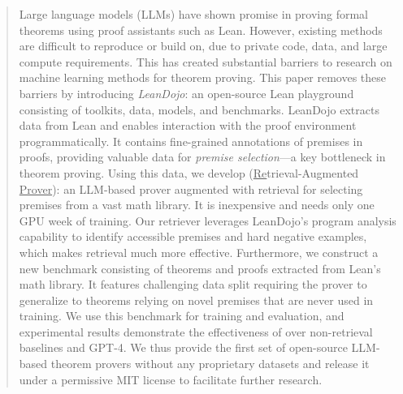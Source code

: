 \begin{abstract}
Large language models (LLMs) have shown promise in proving formal theorems using proof assistants such as Lean. However, existing methods are difficult to reproduce or build on, due to private code, data, and large compute requirements. This has created substantial barriers to research on machine learning methods for theorem proving. This paper removes these barriers by introducing \emph{LeanDojo}: an open-source Lean playground consisting of toolkits, data, models, and benchmarks. LeanDojo extracts data from Lean and enables interaction with the proof environment programmatically. It contains fine-grained annotations of premises in proofs, providing valuable data for \emph{premise selection}---a key bottleneck in theorem proving. Using this data, we develop \emph{\name} (\underline{Re}trieval-Augmented \underline{Prover}): an LLM-based prover augmented with retrieval for selecting premises from a vast math library. It is inexpensive and needs only one GPU week of training. Our retriever leverages LeanDojo's program analysis capability to identify accessible premises and hard negative examples, which makes retrieval much more effective. Furthermore, we construct a new benchmark consisting of {\numproofs} theorems and proofs extracted from Lean's math library. It features challenging data split requiring the prover to generalize to theorems relying on novel premises that are never used in training. We use this benchmark for training and evaluation, and experimental results demonstrate the effectiveness of {\name} over non-retrieval baselines and GPT-4. We thus provide the first set of open-source LLM-based theorem provers without any proprietary datasets and release it under a permissive MIT license to facilitate further research.
\end{abstract}
